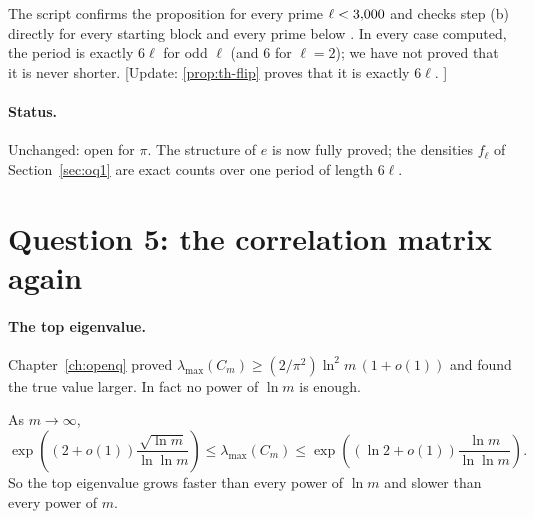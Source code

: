 The script confirms the proposition for every prime $\ell < 3{,}000$ and checks step (b) directly for every starting block and every prime below \ObTlim. In every case computed, the period is exactly $6\ell$ for odd $\ell$ (and 6 for $\ell = 2$); we have not proved that it is never shorter. [Update: \cref{prop:th-flip} proves that it is exactly $6\ell$. \addedon{\revC}]

\paragraph{Status.} Unchanged: open for $\pi$. The structure of $e$ is now fully proved; the densities $f_\ell$ of Section~\ref{sec:oq1} are exact counts over one period of length $6\ell$.

\section{Question 5: the correlation matrix again}\label{sec:ob5}

\paragraph{The top eigenvalue.} Chapter~\ref{ch:openq} proved $\lambda_{\max}(C_m) \ge (2/\pi^2)\ln^2 m\,(1 + o(1))$ and found the true value larger. In fact no power of $\ln m$ is enough.

\begin{theorem}\label{thm:ob-top}
As $m \to \infty$,
\[
  \exp\!\left((2 + o(1))\frac{\sqrt{\ln m}}{\ln\ln m}\right) \le \lambda_{\max}(C_m) \le \exp\!\left((\ln 2 + o(1))\frac{\ln m}{\ln\ln m}\right).
\]
So the top eigenvalue grows faster than every power of $\ln m$ and slower than every power of $m$.
\end{theorem}

